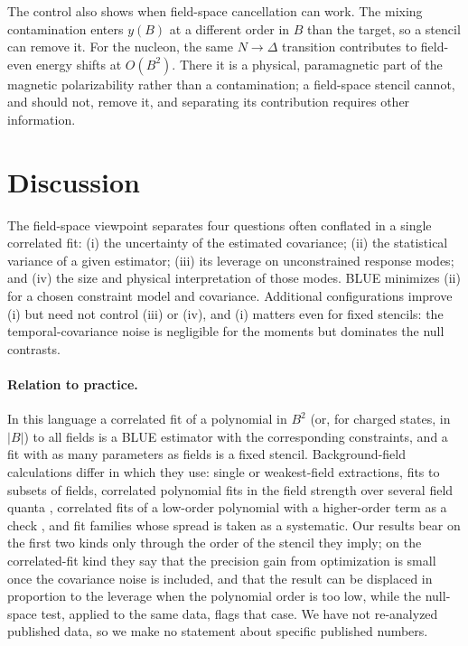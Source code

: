\documentclass[aps,prd,preprint,nofootinbib,floatfix]{revtex4-2}
\begin{document}
The control also shows when field-space cancellation can work. The mixing contamination enters $y(B)$ at a different order in $B$ than the target, so a stencil can remove it. For the nucleon, the same $N\to\Delta$ transition contributes to field-even energy shifts at $O(B^2)$. There it is a physical, paramagnetic part of the magnetic polarizability rather than a contamination; a field-space stencil cannot, and should not, remove it, and separating its contribution requires other information.

\section{Discussion}

The field-space viewpoint separates four questions often conflated in a single correlated fit: (i) the uncertainty of the estimated covariance; (ii) the statistical variance of a given estimator; (iii) its leverage on unconstrained response modes; and (iv) the size and physical interpretation of those modes. BLUE minimizes (ii) for a chosen constraint model and covariance. Additional configurations improve (i) but need not control (iii) or (iv), and (i) matters even for fixed stencils: the temporal-covariance noise is negligible for the moments but dominates the null contrasts.

\paragraph{Relation to practice.} In this language a correlated fit of a polynomial in $B^2$ (or, for charged states, in $|B|$) to all fields is a BLUE estimator with the corresponding constraints, and a fit with as many parameters as fields is a fixed stencil. Background-field calculations differ in which they use: single or weakest-field extractions, fits to subsets of fields, correlated polynomial fits in the field strength over several field quanta \cite{Chang2015LightNuclei}, correlated fits of a low-order polynomial with a higher-order term as a check \cite{Lee2005MagPol,Primer2014}, and fit families whose spread is taken as a systematic. Our results bear on the first two kinds only through the order of the stencil they imply; on the correlated-fit kind they say that the precision gain from optimization is small once the covariance noise is included, and that the result can be displaced in proportion to the leverage when the polynomial order is too low, while the null-space test, applied to the same data, flags that case. We have not re-analyzed published data, so we make no statement about specific published numbers.
\end{document}
